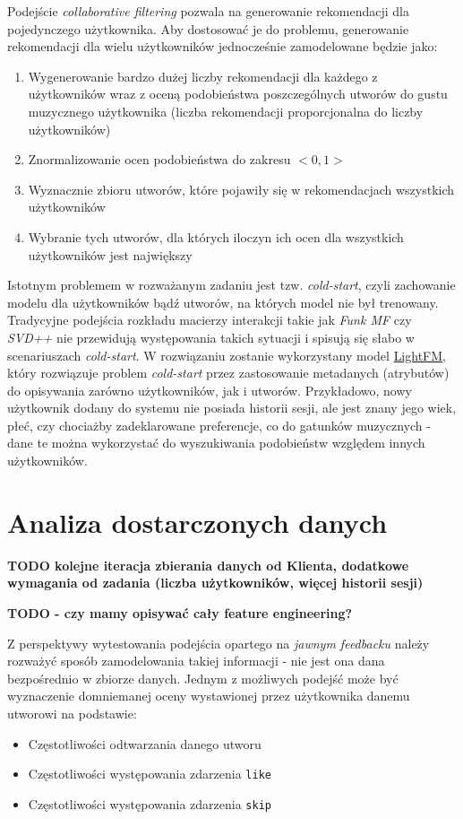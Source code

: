 \documentclass[10pt,a4paper]{article}
\begin{document}
Podejście \textit{collaborative filtering} pozwala na generowanie rekomendacji dla pojedynczego użytkownika. Aby dostosować je do problemu, generowanie rekomendacji dla wielu użytkowników jednocześnie zamodelowane będzie jako:
\begin{enumerate}

\item Wygenerowanie bardzo dużej liczby rekomendacji dla każdego z użytkowników wraz z oceną podobieństwa poszczególnych utworów do gustu muzycznego użytkownika (liczba rekomendacji proporcjonalna do liczby użytkowników)
\item Znormalizowanie ocen podobieństwa do zakresu $<0, 1>$
\item Wyznacznie zbioru utworów, które pojawiły się w rekomendacjach wszystkich użytkowników
\item Wybranie tych utworów, dla których iloczyn ich ocen dla wszystkich użytkowników jest największy

\end{enumerate}

Istotnym problemem w rozważanym zadaniu jest tzw. \textit{cold-start}, czyli zachowanie modelu dla użytkowników bądź utworów, na których model nie był trenowany. Tradycyjne podejścia rozkładu macierzy interakcji takie jak \textit{Funk MF} czy \textit{SVD++} nie przewidują występowania takich sytuacji i spisują się słabo w scenariuszach \textit{cold-start}. W rozwiązaniu zostanie wykorzystany model \href{https://arxiv.org/pdf/1507.08439.pdf}{LightFM}, który rozwiązuje problem \textit{cold-start} przez zastosowanie metadanych (atrybutów) do opisywania zarówno użytkowników, jak i utworów. Przykładowo, nowy użytkownik dodany do systemu nie posiada historii sesji, ale jest znany jego wiek, płeć, czy chociażby zadeklarowane preferencje, co do gatunków muzycznych - dane te można wykorzystać do wyszukiwania podobieństw względem innych użytkowników.

\section{Analiza dostarczonych danych}

\textbf{TODO kolejne iteracja zbierania danych od Klienta, dodatkowe wymagania od zadania (liczba użytkowników, więcej historii sesji)}

\textbf{TODO - czy mamy opisywać cały feature engineering?}

Z perspektywy wytestowania podejścia opartego na \textit{jawnym feedbacku} należy rozważyć sposób zamodelowania takiej informacji - nie jest ona dana bezpośrednio w zbiorze danych. Jednym z możliwych podejść może być wyznaczenie domniemanej oceny wystawionej przez użytkownika danemu utworowi na podstawie:

\begin{itemize}

\item Częstotliwości odtwarzania danego utworu
\item Częstotliwości występowania zdarzenia \texttt{like}
\item Częstotliwości występowania zdarzenia \texttt{skip}

\end{itemize}
	
	
\end{document}
